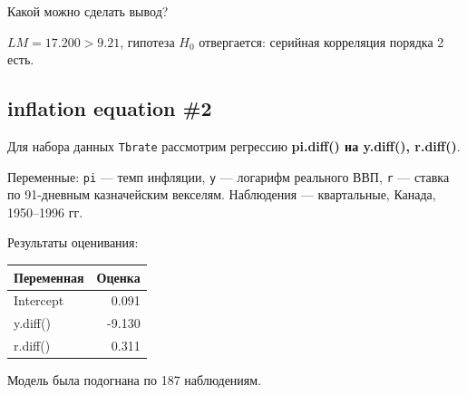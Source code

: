 \documentclass[
  russian,
]{article}
\newcounter{none} %
\begin{document}
Какой можно сделать вывод?

\begin{tcolorbox}[enhanced jigsaw, arc=.35mm, bottomrule=.15mm, bottomtitle=1mm, breakable, colback=white, colbacktitle=quarto-callout-tip-color!10!white, colframe=quarto-callout-tip-color-frame, coltitle=black, left=2mm, leftrule=.75mm, opacityback=0, opacitybacktitle=0.6, rightrule=.15mm, title=\textcolor{quarto-callout-tip-color}{\faLightbulb}\hspace{0.5em}{Вывод (BG-тест)}, titlerule=0mm, toprule=.15mm, toptitle=1mm]

\(LM = 17.200 > 9.21\), гипотеза \(H_0\) отвергается: серийная
корреляция порядка 2 есть.

\end{tcolorbox}

\subsection{inflation equation \#2}\label{inflation-equation-2}

Для набора данных \texttt{Tbrate} рассмотрим регрессию \textbf{pi.diff()
на y.diff(), r.diff()}.

Переменные: \texttt{pi} --- темп инфляции, \texttt{y} --- логарифм
реального ВВП, \texttt{r} --- ставка по 91-дневным казначейским
векселям. Наблюдения --- квартальные, Канада, 1950--1996 гг.

Результаты оценивания:

{\def\LTcaptype{none} %
\begin{longtable}[]{@{}lr@{}}
\toprule\noalign{}
Переменная & Оценка \\
\midrule\noalign{}
\endhead
\bottomrule\noalign{}
\endlastfoot
Intercept & 0.091 \\
y.diff() & -9.130 \\
r.diff() & 0.311 \\
\end{longtable}
}

Модель была подогнана по 187 наблюдениям.
\end{document}
